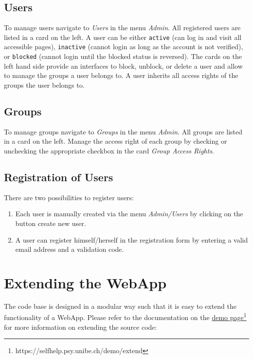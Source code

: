 \documentclass[a4paper,oneside]{book}
\begin{document}
\section{Users}
To manage users navigate to \emph{Users} in the menu \emph{Admin}.
All registered users are listed in a card on the left.
A user can be either \texttt{active} (can log in and visit all accessible pages), \texttt{inactive} (cannot login as long as the account is not verified), or \texttt{blocked} (cannot login until the blocked status is reversed).
The cards on the left hand side provide an interfaces to block, unblock, or delete a user and allow to manage the groups a user belongs to.
A user inherits all access rights of the groups the user belongs to.

\section{Groups}
To manage groups navigate to \emph{Groups} in the menu \emph{Admin}.
All groups are listed in a card on the left.
Manage the access right of each group by checking or unchecking the appropriate checkbox in the card \emph{Group Access Rights}.

\section{Registration of Users}
There are two possibilities to register users:

\begin{enumerate}
    \item Each user is manually created via the menu \emph{Admin/Users} by clicking on the button create new user.
    \item A user can register himself/herself in the registration form by entering a valid email address and a validation code.
\end{enumerate}


\chapter{Extending the WebApp}\label{sec.extend}
The code base is designed in a modular way such that it is easy to extend the functionality of a WebApp.
Please refer to the documentation on the \href{https://selfhelp.psy.unibe.ch/demo/extend}{demo page}\footnote{https://selfhelp.psy.unibe.ch/demo/extend} for more information on extending the source code:
\end{document}
